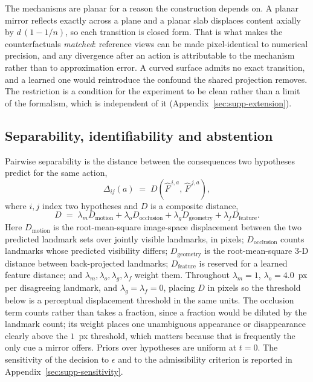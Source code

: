 The mechanisms are planar for a reason the construction depends on. A planar
mirror reflects exactly across a plane and a planar slab displaces content
axially by $d\,(1 - 1/n)$, so each transition is closed form. That is what makes the counterfactuals \emph{matched}: reference views can be
made pixel-identical to numerical precision, and any divergence after an action
is attributable to the mechanism rather than to approximation error. A curved
surface admits no exact transition, and a learned one would reintroduce the
confound the shared projection removes. The restriction is a condition for the
experiment to be clean rather than a limit of the formalism, which is
independent of it (Appendix~\ref{sec:supp-extension}).

\subsection{Separability, identifiability and abstention}
\label{sec:separability}

Pairwise separability is the distance between the consequences two hypotheses
predict for the same action,
\begin{equation}
\label{eq:separability}
\Delta_{ij}(a) \;=\; D\!\left(\hat{F}^{\,i,a},\, \hat{F}^{\,j,a}\right),
\end{equation}
where $i,j$ index two hypotheses and $D$ is a composite distance,
\begin{equation}
\label{eq:distance}
D \;=\; \lambda_m D_{\text{motion}} + \lambda_o D_{\text{occlusion}}
      + \lambda_g D_{\text{geometry}} + \lambda_f D_{\text{feature}} .
\end{equation}
Here $D_{\text{motion}}$ is the root-mean-square image-space displacement between
the two predicted landmark sets over jointly visible landmarks, in pixels;
$D_{\text{occlusion}}$ counts landmarks whose predicted visibility differs;
$D_{\text{geometry}}$ is the root-mean-square 3-D distance between back-projected
landmarks; $D_{\text{feature}}$ is reserved for a learned feature distance; and
$\lambda_m, \lambda_o, \lambda_g, \lambda_f$ weight them. Throughout
$\lambda_m = 1$, $\lambda_o = 4.0$~px per disagreeing landmark, and
$\lambda_g = \lambda_f = 0$, placing $D$ in pixels so the threshold below is a
perceptual displacement threshold in the same units. The occlusion term counts
rather than takes a fraction, since a fraction would be diluted by the landmark
count; its weight places one unambiguous appearance or disappearance clearly above
the $1$~px threshold, which matters because that is frequently the only cue a
mirror offers. Priors over hypotheses are uniform at $t = 0$. The sensitivity of
the decision to $\epsilon$ and to the admissibility criterion is reported in
Appendix~\ref{sec:supp-sensitivity}.

